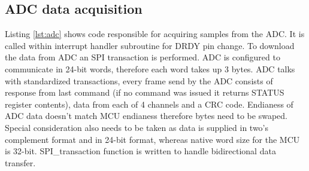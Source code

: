 \documentclass{article}
\begin{document}
\subsection{ADC data acquisition}
Listing \ref{lst:adc} shows code responsible for acquiring samples from the ADC. It is called within interrupt handler subroutine for DRDY pin change. To download the data from ADC an SPI transaction is performed.
ADC is configured to communicate in 24-bit words, therefore each word takes up 3 bytes. ADC talks with standardized transactions,
every frame send by the ADC consists of response from last command (if no command was issued it returns STATUS register contents), data from each of 4 channels and a CRC code.
Endianess of ADC data doesn't match MCU endianess therefore bytes need to be swaped. Special consideration also needs to be taken as data is supplied in two's complement format and in 24-bit format, whereas native word size for the MCU is 32-bit.
SPI_transaction function is written to handle bidirectional data transfer.

\end{document}
